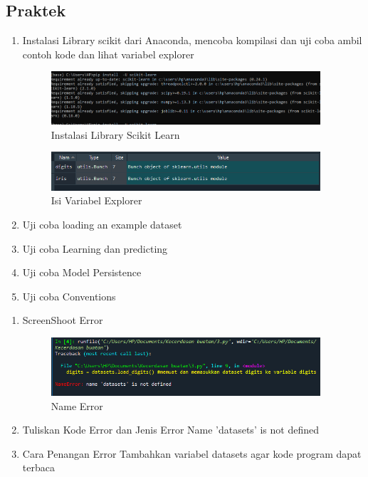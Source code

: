 \subsection{Praktek}
\begin{enumerate}
\item Instalasi Library scikit dari Anaconda, mencoba kompilasi dan uji coba ambil contoh kode dan lihat variabel explorer
	\hfill\break
	\begin{figure}[h]
		\includegraphics[width=10cm]{figures/1184026/chapter1/Capture.PNG}
		\centering
		\caption{Instalasi Library Scikit Learn}
	\end{figure}
	\begin{figure}[h]
		\includegraphics[width=10cm]{figures/1184026/chapter1/variabel eksplore.PNG}
		\centering
		\caption{Isi Variabel Explorer}
	\end{figure}
	\item Uji coba loading an example dataset
	\hfill\break

\item Uji coba Learning dan predicting
	\hfill\break
	
\item Uji coba Model Persistence
	\hfill\break
	
	\item Uji coba Conventions
	\hfill\break
	
\end{enumerate}
\begin{enumerate}
	\item ScreenShoot Error
	\begin{figure}[h]
		\includegraphics[width=10cm]{figures/1184026/chapter1/eror1.PNG}
		\centering
		\caption{Name Error}
	\end{figure}
	\item Tuliskan Kode Error dan Jenis Error
	\hfill\break
	Name 'datasets' is not defined
\hfill\break
	\item Cara Penangan Error
\hfill\break Tambahkan variabel datasets agar kode program dapat terbaca
	\end{enumerate}
